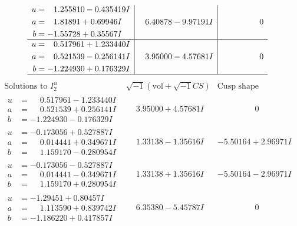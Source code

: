 \documentclass[1p]{elsarticle_modified}
\theoremstyle{definition}
\newcommand{\I}{\sqrt{-1}}
\begin{document}
$$\begin{array}{c|c|c}
\begin{aligned}
u &= \phantom{-}1.255810 - 0.435419 I \\
a &= \phantom{-}1.81891 + 0.69946 I \\
b &= -1.55728 + 0.35567 I\end{aligned}
 & \phantom{-}6.40878 - 9.97191 I & \phantom{-0.000000 } 0 \\ \hline\begin{aligned}
u &= \phantom{-}0.517961 + 1.233440 I \\
a &= \phantom{-}0.521539 - 0.256141 I \\
b &= -1.224930 + 0.176329 I\end{aligned}
 & \phantom{-}3.95000 - 4.57681 I & \phantom{-0.000000 } 0\\
 \hline 
 \end{array}$$\newpage$$\begin{array}{c|c|c}  
\text{Solutions to }I^u_{2}& \I (\text{vol} + \sqrt{-1}CS) & \text{Cusp shape}\\
 \hline 
\begin{aligned}
u &= \phantom{-}0.517961 - 1.233440 I \\
a &= \phantom{-}0.521539 + 0.256141 I \\
b &= -1.224930 - 0.176329 I\end{aligned}
 & \phantom{-}3.95000 + 4.57681 I & \phantom{-0.000000 } 0 \\ \hline\begin{aligned}
u &= -0.173056 + 0.527887 I \\
a &= \phantom{-}0.014441 + 0.349671 I \\
b &= \phantom{-}1.159170 - 0.280954 I\end{aligned}
 & \phantom{-}1.33138 - 1.35616 I & -5.50164 + 2.96971 I \\ \hline\begin{aligned}
u &= -0.173056 - 0.527887 I \\
a &= \phantom{-}0.014441 - 0.349671 I \\
b &= \phantom{-}1.159170 + 0.280954 I\end{aligned}
 & \phantom{-}1.33138 + 1.35616 I & -5.50164 - 2.96971 I \\ \hline\begin{aligned}
u &= -1.29451 + 0.80457 I \\
a &= \phantom{-}1.113590 + 0.839742 I \\
b &= -1.186220 + 0.417857 I\end{aligned}
 & \phantom{-}6.35380 - 5.45787 I & \phantom{-0.000000 } 0 \\ \hline\begin{aligned}

\end{aligned}
\end{array}$$
\end{document}
